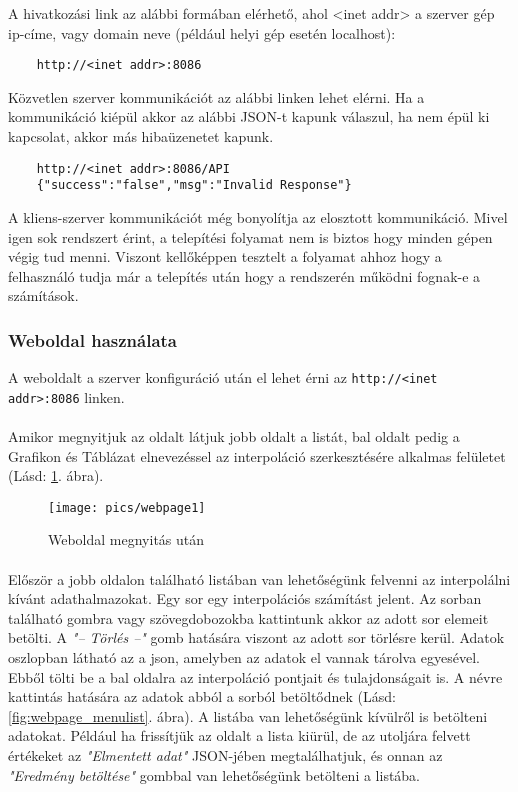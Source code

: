 	\newline A hivatkozási link az alábbi formában elérhető, ahol <inet addr> a szerver gép ip-címe, vagy domain neve (például helyi gép esetén localhost):  
	\begin{verbatim}
	http://<inet addr>:8086
	\end{verbatim}
	Közvetlen szerver kommunikációt az alábbi linken lehet elérni. 
	Ha a kommunikáció kiépül akkor az alábbi JSON-t kapunk válaszul, ha nem épül ki kapcsolat, akkor más hibaüzenetet kapunk. 
	\begin{verbatim}
	http://<inet addr>:8086/API 
	{"success":"false","msg":"Invalid Response"}
	\end{verbatim}
	A kliens-szerver kommunikációt még bonyolítja az elosztott kommunikáció.
	Mivel igen sok rendszert érint, a telepítési folyamat nem is biztos hogy minden gépen végig tud menni. \newline
	Viszont kellőképpen tesztelt a folyamat ahhoz hogy a felhasználó tudja már a telepítés után hogy a rendszerén működni fognak-e a számítások.
\subsubsection{Weboldal használata}
	A weboldalt a szerver konfiguráció után el lehet érni az \texttt{http://<inet addr>:8086} linken.

	\paragraph{}
	Amikor megnyitjuk az oldalt látjuk jobb oldalt a listát, bal oldalt pedig a Grafikon és Táblázat elnevezéssel az interpoláció szerkesztésére alkalmas felületet
	(Lásd: \ref{fig:webpage1}. ábra).

	\begin{figure}[h]
		\texttt{[image: pics/webpage1]}
		\centering
		\caption{Weboldal megnyitás után\label{fig:webpage1}}
	\end{figure}

	\paragraph{}
	Először a jobb oldalon található listában van lehetőségünk felvenni az interpolálni kívánt adathalmazokat. Egy sor egy interpolációs számítást jelent. Az sorban található gombra vagy szövegdobozokba kattintunk akkor az adott sor elemeit betölti.
	A \textit{"-- Törlés --"} gomb hatására viszont az adott sor törlésre kerül. \newline
	Adatok oszlopban látható az a json, amelyben az adatok el vannak tárolva egyesével. Ebből tölti be a bal oldalra az interpoláció pontjait és tulajdonságait is. A névre kattintás hatására az adatok abból a sorból betöltődnek (Lásd: \ref{fig:webpage_menulist}. ábra). \newline 
	A listába van lehetőségünk kívülről is betölteni adatokat. Például ha frissítjük az oldalt a lista kiürül, de az utoljára felvett értékeket az \textit{"Elmentett adat"} JSON-jében megtalálhatjuk, és onnan az \textit{"Eredmény betöltése"} gombbal van lehetőségünk betölteni a listába.

